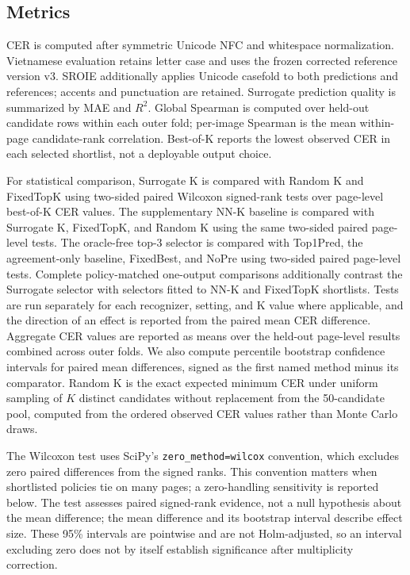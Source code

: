 \documentclass[pdflatex,sn-basic,Numbered,iicol]{sn-jnl}
\begin{document}
\subsection{Metrics}

CER is computed after symmetric Unicode NFC and whitespace normalization. Vietnamese evaluation retains letter case and uses the frozen corrected reference version v3. SROIE additionally applies Unicode casefold to both predictions and references; accents and punctuation are retained. Surrogate prediction quality is summarized by MAE and $R^2$. Global Spearman is computed over held-out candidate rows within each outer fold; per-image Spearman is the mean within-page candidate-rank correlation. Best-of-K reports the lowest observed CER in each selected shortlist, not a deployable output choice.

For statistical comparison, Surrogate K is compared with Random K and FixedTopK using two-sided paired Wilcoxon signed-rank tests over page-level best-of-K CER values. The supplementary NN-K baseline is compared with Surrogate K, FixedTopK, and Random K using the same two-sided paired page-level tests. The oracle-free top-3 selector is compared with Top1Pred, the agreement-only baseline, FixedBest, and NoPre using two-sided paired page-level tests. Complete policy-matched one-output comparisons additionally contrast the Surrogate selector with selectors fitted to NN-K and FixedTopK shortlists. Tests are run separately for each recognizer, setting, and K value where applicable, and the direction of an effect is reported from the paired mean CER difference. Aggregate CER values are reported as means over the held-out page-level results combined across outer folds. We also compute percentile bootstrap confidence intervals for paired mean differences, signed as the first named method minus its comparator. Random K is the exact expected minimum CER under uniform sampling of $K$ distinct candidates without replacement from the 50-candidate pool, computed from the ordered observed CER values rather than Monte Carlo draws.

The Wilcoxon test uses SciPy's \texttt{zero\_method=wilcox} convention, which excludes zero paired differences from the signed ranks. This convention matters when shortlisted policies tie on many pages; a zero-handling sensitivity is reported below. The test assesses paired signed-rank evidence, not a null hypothesis about the mean difference; the mean difference and its bootstrap interval describe effect size. These 95\% intervals are pointwise and are not Holm-adjusted, so an interval excluding zero does not by itself establish significance after multiplicity correction.
\end{document}
